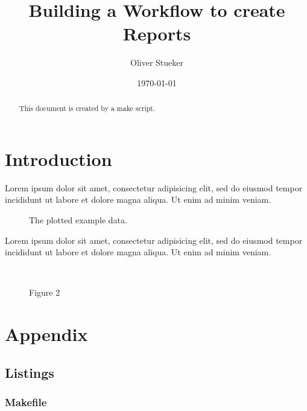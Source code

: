 \documentclass[10pt,letterpaper]{article}
\begin{document}
\title{Building a Workflow to create Reports}
\author{Oliver Stueker}
\date{\today}
\maketitle

\begin{abstract}
This document is created by a make script.
\end{abstract}

\section{Introduction}
Lorem ipsum dolor sit amet, consectetur adipisicing elit, sed do eiusmod
tempor incididunt ut labore et dolore magna aliqua. Ut enim ad minim veniam.

\begin{figure}[!ht]
	\centering
	
	\caption{The plotted example data.}
\end{figure}

Lorem ipsum dolor sit amet, consectetur adipisicing elit, sed do eiusmod
tempor incididunt ut labore et dolore magna aliqua. Ut enim ad minim veniam.

\begin{figure}
	\centering
	\subfloat[Figure 2a]{
		
		\label{fig:figure2a}
	}
	~
	\subfloat[Figure 2b]{
		
		\label{fig:figure2b}
	}
	~
	\subfloat[Figure 2c]{
		
		\label{fig:figure2c}
	}
	\caption{Figure 2}
	\label{fig:figure2}
\end{figure}

\newpage
\section{Appendix}
\subsection{Listings}

\subsubsection{Makefile}
\inputminted[linenos,frame=single]{makefile}{Makefile}
\end{document}
